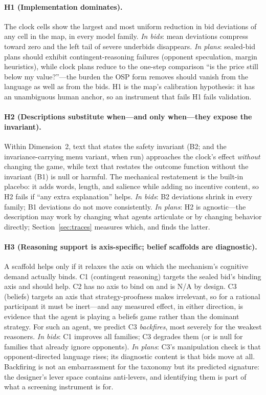 \paragraph{H1 (Implementation dominates).}
The clock cells show the largest and most uniform reduction in bid deviations of any cell in the map, in every model family. \emph{In bids}: mean deviations compress toward zero and the left tail of severe underbids disappears. \emph{In plans}: sealed-bid plans should exhibit contingent-reasoning failures (opponent speculation, margin heuristics), while clock plans reduce to the one-step comparison ``is the price still below my value?''---the burden the OSP form removes should vanish from the language as well as from the bids. H1 is the map's calibration hypothesis: it has an unambiguous human anchor, so an instrument that fails H1 fails validation.

\paragraph{H2 (Descriptions substitute when---and only when---they expose the invariant).}
Within Dimension~2, text that states the safety invariant (B2; and the invariance-carrying menu variant, when run) approaches the clock's effect \emph{without} changing the game, while text that restates the outcome function without the invariant (B1) is null or harmful. The mechanical restatement is the built-in placebo: it adds words, length, and salience while adding no incentive content, so H2 fails if ``any extra explanation'' helps. \emph{In bids}: B2 deviations shrink in every family; B1 deviations do not move consistently. \emph{In plans}: H2 is agnostic---the description may work by changing what agents articulate or by changing behavior directly; Section~\ref{sec:traces} measures which, and finds the latter.

\paragraph{H3 (Reasoning support is axis-specific; belief scaffolds are diagnostic).}
A scaffold helps only if it relaxes the axis on which the mechanism's cognitive demand actually binds. C1 (contingent reasoning) targets the sealed bid's binding axis and should help. C2 has no axis to bind on and is N/A by design. C3 (beliefs) targets an axis that strategy-proofness makes irrelevant, so for a rational participant it must be inert---and any measured effect, in either direction, is evidence that the agent is playing a beliefs game rather than the dominant strategy. For such an agent, we predict C3 \emph{backfires}, most severely for the weakest reasoners. \emph{In bids}: C1 improves all families; C3 degrades them (or is null for families that already ignore opponents). \emph{In plans}: C3's manipulation check is that opponent-directed language rises; its diagnostic content is that bids move at all. Backfiring is not an embarrassment for the taxonomy but its predicted signature: the designer's lever space contains anti-levers, and identifying them is part of what a screening instrument is for.

